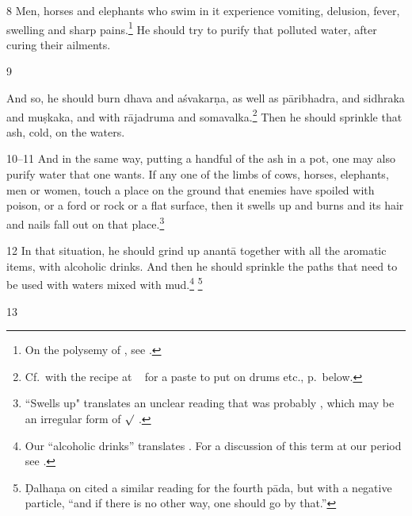 \begin{translation}
\item [8]  Men, horses and elephants who swim in it  experience
vomiting, delusion, fever, swelling and sharp pains.\footnote{On  the
    polysemy of , see \cite{seme-1979}.} 
    He should try to purify that polluted water,  after curing their
    ailments.

\item [9]  
 
And so, he should burn \gls{dhava} and \gls{aśvakarṇa}, %
as well as \gls{pāribhadra}, %
and  \gls{sidhraka} and  \gls{muṣkaka}, %
and with \gls{rājadruma} %
and \gls{somavalka}.\footnote{\label{water-detox}Cf.\ with the
    recipe at \SS\  for a paste to put on drums etc., 
    p.\,\pageref{drum-detox} below.}
    Then he should sprinkle that ash, cold, on  the waters.

\item
 [10--11]  And in the same way, putting a handful of  the ash in a pot, one may 
 also purify water  that  one wants.  If any one of the limbs of cows, horses,  
 elephants, men or women, touch a place on the ground that enemies have 
 spoiled with  poison, or a ford or rock or a flat surface, then it swells up and 
 burns and its  hair and nails fall out on that place.\footnote{``Swells up" 
 translates an  unclear reading that was probably , which may be 
 an irregular  form of $\surd$  
 \citep[see][175--176]{whit-root}.}  

\item
 [12]  In that situation, he should grind up  \gls{anantā} together with all the  
 aromatic items, with alcoholic drinks.  And then he should sprinkle the paths 
 that need to be used with waters mixed with  mud.\footnote{Our “alcoholic 
 drinks”  translates .  For a discussion of this  term at our period see 
 \cite[37--39 \emph{et passim}]{mchu-2021}.}  \footnote{Ḍalhaṇa on   
 cited a similar  reading for the fourth pāda, but with a negative particle, “and if 
 there is no other way, one  should go by that.”}  

\item [13]  


\end{translation}
